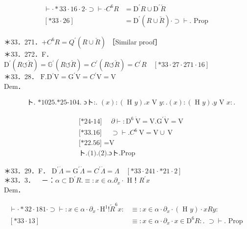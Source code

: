 \documentclass[10pt]{article}
\begin{document}
$$
\begin{aligned}
\vdash \cdot * 33 \cdot 16 \cdot 2 \cdot \supset \vdash \cdot C^{6} R & =\mathrm{D}^{\prime} R \cup \mathrm{D}^{\prime} \breve{R} \\
{[* 33 \cdot 26] } & =\mathrm{D}^{\prime}(R \cup \breve{R}) \cdot \supset \vdash . \text { Prop }
\end{aligned}
$$

＊33．271．$+C^{6} R=Q^{\prime}(R \cup \breve{R})$ ［Similar proof］\\
＊33．272．F． $\mathrm{D}^{\prime}(R \circlearrowleft \breve{R})=\mathbb{G}^{\prime}(R \circlearrowleft \breve{R})=C^{\prime}(R \circlearrowleft \breve{R})=C^{\prime} R \quad[* 33 \cdot 27 \cdot 271 \cdot 16]$\\
＊33．28． $\mathrm{F} . \mathrm{D}{ }^{\prime} \mathrm{V}=\mathrm{G}^{\prime} \mathrm{V}=C^{\prime} \mathrm{V}=\mathrm{V}$\\
Dem．

$$
\begin{aligned}
& \text { ト. *1025.*25-104. ɔト:. }(x):(\text { H } y) . x \text { V } y: .(x):(\text { H } y) . y \text { V } x: .
\end{aligned}
$$


\begin{align*}
& \text { [*24-14] } \quad \partial \vdash: \mathrm{D}^{6} \dot{\mathrm{~V}}=\mathrm{V} . \mathrm{G}^{\prime} \dot{\mathrm{V}}=\mathrm{V}  \tag{1}\\
& \text { [*33.16] } \quad \supset \vdash . C^{6} \mathrm{~V}=\mathrm{V} \cup \mathrm{~V} \\
& \text { [*22.56] =V }  \tag{2}\\
& \text { ト.(1).(2).ɔト.Prop }
\end{align*}


＊33．29．F． $\mathrm{D}^{\prime} \dot{\Lambda}=\mathrm{G}^{\prime} \dot{\Lambda}=C^{\prime} \dot{\Lambda}=\Lambda \quad[* 33 \cdot 241 \cdot * 21 \cdot 2]$\\
＊33．3．$\quad$－：$\alpha \subset \mathrm{D}^{\prime} R . \equiv: x \in \alpha . \partial_{x} \cdot$ H！$R^{\prime} x$\\
Dem．

$$
\begin{aligned}
\vdash \cdot * 32 \cdot 181 \cdot \supset \vdash: x \in \alpha \cdot \partial_{x} \cdot \mathrm{H}^{1}!\overleftarrow{R}^{6} x: & \equiv: x \in \alpha \cdot \partial_{x} \cdot(\text { H } y) \cdot x R y: \\
{[* 33 \cdot 13] } & \equiv: x \in \alpha \cdot \partial_{x} \cdot x \in \mathrm{D}^{6} R: \text {. } \supset \vdash . \text { Prop }
\end{aligned}
$$
\end{document}
